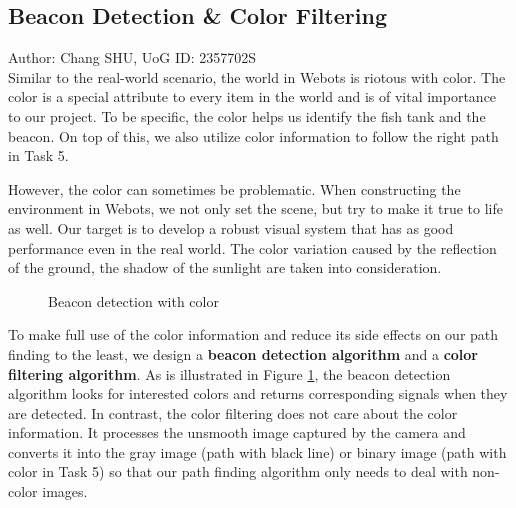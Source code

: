 \subsection{Beacon Detection \& Color Filtering\label{sec4.2.1}}
Author: Chang SHU, UoG ID: 2357702S\\

Similar to the real-world scenario, the world in Webots is riotous with color. The color is a special attribute to every item in the world and is of vital importance to our project. To be specific, the color helps us identify the fish tank and the beacon. On top of this, we also utilize color information to follow the right path in Task 5.

However, the color can sometimes be problematic. When constructing the environment in Webots, we not only set the scene, but try to make it true to life as well. Our target is to develop a robust visual system that has as good performance even in the real world. The color variation caused by the reflection of the ground, the shadow of the sunlight are taken into consideration.

\begin{figure}[htbp]
    \centering
    \caption{Beacon detection with color}
    \label{fig:beacon_detection}
\end{figure}

To make full use of the color information and reduce its side effects on our path finding to the least, we design a \textbf{beacon detection algorithm} and a \textbf{color filtering algorithm}. As is illustrated in Figure \ref{fig:beacon_detection}, the beacon detection algorithm looks for interested colors and returns corresponding signals when they are detected. In contrast, the color filtering does not care about the color information. It processes the unsmooth image captured by the camera and converts it into the gray image (path with black line) or binary image (path with color in Task 5) so that our path finding algorithm only needs to deal with non-color images.

